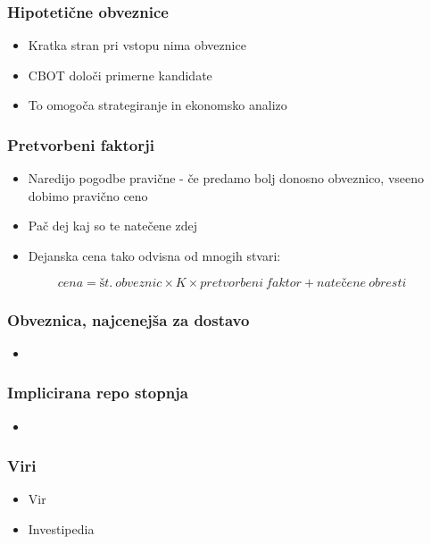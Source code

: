 \documentclass[14pt]{beamer}
\begin{document}
\begin{frame}
    \frametitle{Hipotetične obveznice}
    
    \begin{itemize}
        \item Kratka stran pri vstopu nima obveznice
        \item CBOT določi primerne kandidate
        \item To omogoča strategiranje in ekonomsko analizo
    \end{itemize}


\end{frame}


\begin{frame}
    \frametitle{Pretvorbeni faktorji}
    
    \begin{itemize}
        \item Naredijo pogodbe pravične - če predamo bolj donosno
                obveznico, vseeno dobimo pravično ceno
        \item Pač dej kaj so te natečene zdej
        \item Dejanska cena tako odvisna od mnogih stvari:
    \end{itemize}
    $$ cena = št.\:obveznic \times K \times pretvorbeni\:faktor + natečene\:obresti $$


\end{frame}


\begin{frame}
    \frametitle{Obveznica, najcenejša za dostavo}
    
    \begin{itemize}
        \item 
    \end{itemize}

    \note[item]{}

\end{frame}


\begin{frame}
    \frametitle{Implicirana repo stopnja}
    
    \begin{itemize}
        \item 
    \end{itemize}

    \note[item]{}

\end{frame}


\begin{frame}
    \frametitle{Viri}
    
    \begin{itemize}
        \item Vir 
        \item Investipedia
    \end{itemize}

\end{frame}
\end{document}

